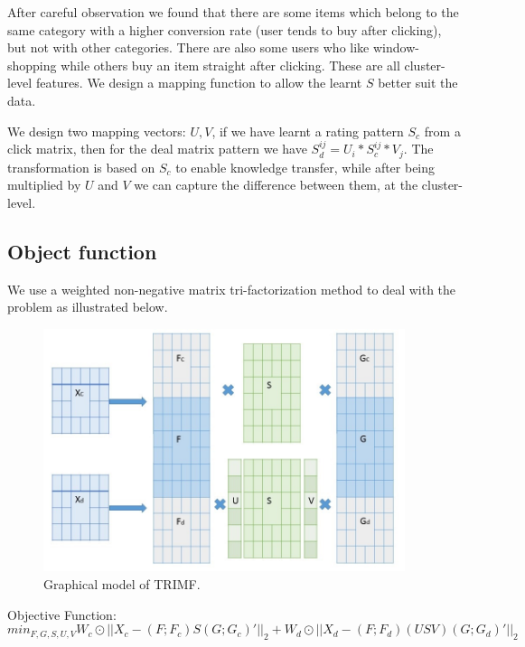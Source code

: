 \par{After careful observation we found that there are some items which belong to the same category with a higher conversion rate (user tends to buy after clicking), but not with other categories. There are also some users who like window-shopping while others buy an item straight after clicking. These are all cluster-level features. We design a mapping function to allow the learnt $S$ better suit the data.

We design two mapping vectors: $U,V$, if we have learnt a rating pattern $S_c$ from a click matrix, then for the deal matrix pattern we have $S_d^{ij} = U_i * S_c^{ij} * V_j$. The transformation is based on $S_c$ to enable knowledge transfer, while after being multiplied by $U$ and $V$ we can capture the difference between them, at the cluster-level. }

\subsection{Object function}
\par{We use a weighted non-negative matrix tri-factorization method to deal with the problem as illustrated below. 
\begin{figure}


\begin{center}
\includegraphics[width=400px]{fig/trimf.jpg} 
\caption{Graphical model of TRIMF.}
\label{fig:trimf}
\end{center}
\end{figure}}
 
  \par{Objective Function:$$min_{F,G,S,U,V} W_c\odot ||X_c - (F;F_c)S(G;G_c)'||_2 + W_d\odot ||X_d - (F;F_d)(USV)(G;G_d)'||_2 $$}

